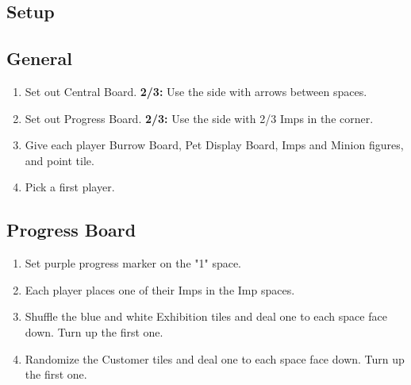 \documentclass[12pt]{article}
\newenvironment{enumerateCustom}
{\begin{enumerate}
  \setlength{\itemsep}{1pt}
  \setlength{\parskip}{0pt}
  \setlength{\parsep}{0pt}}
{\end{enumerate}}
\begin{document}
\begin{multicols*}{2}

\section*{Setup}
\subsection*{General}
\begin{enumerateCustom}
	\item Set out Central Board. \textbf{2/3:} Use the side with arrows between spaces.
	\item Set out Progress Board. \textbf{2/3:} Use the side with 2/3 Imps in the corner.
	\item Give each player Burrow Board, Pet Display Board, Imps and Minion figures, and point tile.
	\item Pick a first player.
\end{enumerateCustom}

\subsection*{Progress Board}
\begin{enumerateCustom}
	\item Set purple progress marker on the "1" space.
	\item Each player places one of their Imps in the Imp spaces.
	\item Shuffle the blue and white Exhibition tiles and deal one to each space face down. Turn up the first one.
	\item Randomize the Customer tiles and deal one to each space face down. Turn up the first one.
\end{enumerateCustom}


\end{multicols*}
\end{document}
